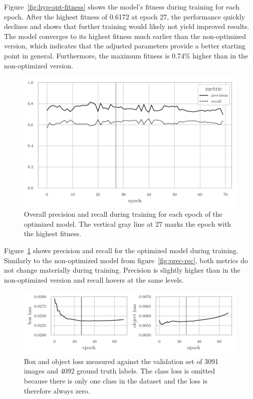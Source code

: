 \documentclass[draft,final]{vutinfth} %
\begin{document}
Figure~\ref{fig:hyp-opt-fitness} shows the model's fitness during
training for each epoch. After the highest fitness of 0.6172 at epoch
27, the performance quickly declines and shows that further training
would likely not yield improved results. The model converges to its
highest fitness much earlier than the non-optimized version, which
indicates that the adjusted parameters provide a better starting point
in general. Furthermore, the maximum fitness is 0.74\% higher than in
the non-optimized version.

\begin{figure}
  \centering
  \includegraphics{graphics/precision_recall_final.pdf}
  \caption[Hyper-parameter optimized object detection precision and
  recall during training.]{Overall precision and recall during
    training for each epoch of the optimized model. The vertical gray
    line at 27 marks the epoch with the highest fitness.}
  \label{fig:hyp-opt-prec-rec}
\end{figure}

Figure~\ref{fig:hyp-opt-prec-rec} shows precision and recall for the
optimized model during training. Similarly to the non-optimized model
from figure~\ref{fig:prec-rec}, both metrics do not change materially
during training. Precision is slightly higher than in the
non-optimized version and recall hovers at the same levels.

\begin{figure}
  \centering
  \includegraphics{graphics/val_box_obj_loss_final.pdf}
  \caption[Hyper-parameter optimized object detection box and object
  loss.]{Box and object loss measured against the validation set of
    3091 images and 4092 ground truth labels. The class loss is
    omitted because there is only one class in the dataset and the
    loss is therefore always zero.}
  \label{fig:hyp-opt-box-obj-loss}
\end{figure}
\end{document}
